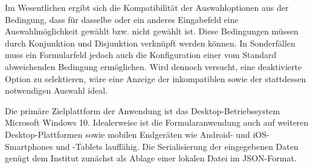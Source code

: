\vspace{14pt}

Im Wesentlichen ergibt sich die Kompatibilität 
der Auswahloptionen aus der Bedingung, 
dass für dasselbe oder ein anderes Eingabefeld eine Auswahlmöglichkeit gewählt bzw.
nicht gewählt ist. Diese Bedingungen müssen durch 
Konjunktion und Disjunktion verknüpft werden können.
In Sonderfällen muss ein Formularfeld jedoch auch 
die Konfiguration einer vom Standard abweichenden Bedingung
ermöglichen. 
Wird dennoch versucht,
eine deaktivierte Option zu selektieren, wäre eine Anzeige der
inkompatiblen sowie der stattdessen notwendigen Auswahl ideal.

\vspace{14pt}
Die primäre Zielplattform der Anwendung ist das Desktop-Betriebssystem
Microsoft Windows 10.
Idealerweise ist die Formularanwendung auch auf weiteren Desktop-Plattformen sowie
mobilen Endgeräten wie Android- und iOS-Smartphones und -Tablets
lauffähig. Die Serialisierung der eingegebenen Daten genügt dem Institut 
zunächst als Ablage einer lokalen Datei im JSON-Format. 












